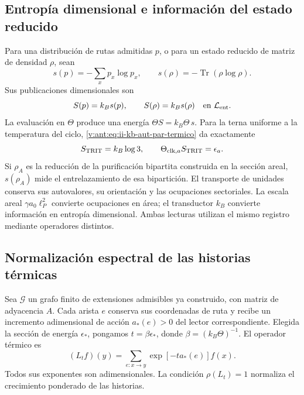 \subsection{Entropía dimensional e información del estado reducido}

Para una distribución de rutas admitidas \(p\), o para un estado
reducido de matriz de densidad \(\rho\), sean
\[
 s(p)=-\sum_xp_x\log p_x,\qquad
 s(\rho)=-\operatorname{Tr}(\rho\log\rho).
\]
Sus publicaciones dimensionales son
\begin{equation}
 S(p)=k_Bs(p),\qquad S(\rho)=k_Bs(\rho)
 \quad\text{en }\mathcal L_{\rm ent}.
 \label{v:ant:eq:ii-kb-aut-entropia}
\end{equation}
La evaluación en \(\Theta\) produce una energía
\(\Theta S=k_B\Theta\,s\). Para la terna uniforme a la temperatura
del ciclo, \eqref{v:ant:eq:ii-kb-aut-par-termico} da exactamente
\[
 S_{\rm TRIT}=k_B\log3,\qquad
 \Theta_{{\rm clk},a}S_{\rm TRIT}=\epsilon_a.
\]
Si \(\rho_A\) es la reducción de la purificación bipartita
construida en la sección areal, \(s(\rho_A)\) mide el entrelazamiento
de esa bipartición. El transporte de unidades conserva sus
autovalores, su orientación y las ocupaciones sectoriales. La escala
areal \(\gamma a_0\ell_P^2\) convierte ocupaciones en área; el
transductor \(k_B\) convierte información en entropía dimensional.
Ambas lecturas utilizan el mismo registro mediante operadores distintos.

\subsection{Normalización espectral de las historias térmicas}

Sea \(\mathcal G\) un grafo finito de extensiones admisibles ya
construido, con matriz de adyacencia \(A\). Cada arista \(e\) conserva
sus coordenadas de ruta y recibe un incremento adimensional de acción
\(a_*(e)>0\) del lector correspondiente. Elegida la sección de energía
\(\epsilon_*\), pongamos \(t=\beta\epsilon_*\), donde
\(\beta=(k_B\Theta)^{-1}\). El operador térmico es
\begin{equation}
 (L_tf)(y)=\sum_{e:x\to y}\exp[-t a_*(e)]f(x).
 \label{v:ant:eq:ii-kb-aut-operador}
\end{equation}
Todos sus exponentes son adimensionales. La condición
\(\rho(L_t)=1\) normaliza el crecimiento ponderado de las historias.

